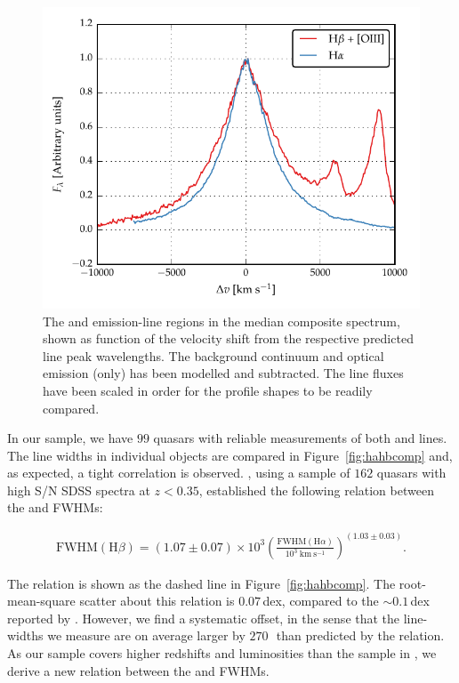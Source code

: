 \begin{figure}
    \centering
    \includegraphics[width=0.8\linewidth]{figures/chapter03/ha_hb_composite.pdf}
    \caption[{The \ha and \hb emission-line regions in the median composite spectrum.}]{The \ha and \hb emission-line regions in the median composite spectrum, shown as function of the velocity shift from the respective predicted line peak wavelengths. The background continuum and optical  emission (\hb only) has been modelled and subtracted. The line fluxes have been scaled in order for the profile shapes to be readily compared.}
    \label{fig:balmer_composite}
\end{figure}

In our sample, we have $99$ quasars with reliable measurements of both \ha and \hb lines.
The line widths in individual objects are compared in Figure~\ref{fig:hahbcomp} and, as expected, a tight correlation is observed.
\citet{greene05b}, using a sample of $162$ quasars with high S/N SDSS spectra at $z < 0.35$, established the following relation between the \ha and \hb FWHMs:

\begingroup\makeatletter{}\check@mathfonts
\begin{eqnarray}
  \text{FWHM}(\text{H}\beta) = \left( 1.07 \pm 0.07 \right) \times 10^3 \left( \frac{ \text{FWHM}(\text{H}\alpha) }{10^3 ~\text{km}~\text{s}^{-1} } \right)^{(1.03 \pm 0.03)}.
\end{eqnarray}
\endgroup

\noindent The relation is shown as the dashed line in Figure~\ref{fig:hahbcomp}.
The root-mean-square scatter about this relation is $0.07$\,dex, compared to the $\sim0.1$\,dex reported by \citet{greene05b}.
However, we find a systematic offset, in the sense that the \hb line-widths we measure are on average larger by $270$\,\kms\, than predicted by the \citet{greene05b} relation.
As our sample covers higher redshifts and luminosities than the sample in \citet{greene05b}, we derive a new relation between the \ha and \hb FWHMs.

